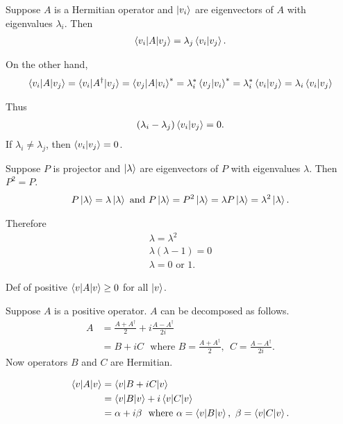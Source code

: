 Suppose $A$ is a Hermitian operator and $\ket{v_i}$ are eigenvectors of $A$ with eigenvalues $\lambda_i$.
Then
\begin{align*}
	\braket{v_i | A | v_j} = \lambda_j \braket{v_i | v_j}.
\end{align*}

On the other hand,
\begin{align*}
	\braket{v_i | A | v_j} = \braket{v_i | A^\dagger | v_j}
	= \braket{v_j | A | v_i}^*
	= \lambda_i^* \braket{v_j | v_i}^*
	=  \lambda_i^* \braket{v_i | v_j}
	=  \lambda_i \braket{v_i | v_j}
\end{align*}

Thus
\begin{align*}
	(\lambda_i - \lambda_j) \braket{v_i | v_j}  = 0.
\end{align*}
If $\lambda_i \neq \lambda_j$, then $\braket{v_i | v_j}  = 0$.



Suppose $P$ is projector and $\ket{\lambda}$  are eigenvectors of $P$ with eigenvalues $\lambda$.
Then $P^2 = P$.
\begin{align*}
	P \ket{\lambda} = \lambda \ket{\lambda} \text{ and }	P \ket{\lambda} = P^2 \ket{\lambda} = \lambda  P \ket{\lambda} = \lambda^2 \ket{\lambda}.
\end{align*}

Therefore
\begin{align*}
	\lambda = \lambda^2\\
	\lambda (\lambda - 1) = 0\\
	\lambda = 0 \text{ or } 1.
\end{align*}



Def of positive $\braket{v | A | v} \geq 0$ for all $\ket{v}$.

Suppose $A$ is a positive operator. $A$ can be decomposed as follows.
\begin{align*}
	A &= \frac{A + A^\dagger}{2} + i \frac{A - A^\dagger}{2i}\\
		&= B + i C  ~~~\text{where } B =\frac{A + A^\dagger}{2}, ~~  C = \frac{A - A^\dagger}{2i}.
\end{align*}
Now operators $B$ and $C$ are Hermitian.

\begin{align*}
	\braket{v | A | v}  &= \braket{v | B + iC | v}\\
		&= \braket{v | B | v}  + i \braket{v | C | v}\\
		&= \alpha + i \beta ~~ \text{where } \alpha = \braket{v | B | v}, ~\beta = \braket{v | C | v}.
\end{align*}

